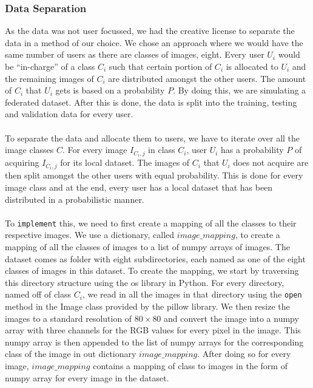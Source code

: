 \documentclass[12pt]{article}
\begin{document}
\subsubsection{Data Separation}
As the data was not user focussed, we had the creative license to separate the data in a method of our choice. We chose an approach where we would have the same number of users as there are classes of images, eight. Every user $U_i$ would be ``in-charge'' of a class $C_i$ such that certain portion of $C_i$ is allocated to $U_i$ and the remaining images of $C_i$ are distributed amongst the other users. The amount of $C_i$ that $U_i$ gets is based on a probability $P$. By doing this, we are simulating a federated dataset. After this is done, the data is split into the training, testing and validation data for every user.
\\\\
To separate the data and allocate them to users, we have to iterate over all the image classes $C$. For every image $I_{C_i, j}$ in class $C_i$, user $U_i$ has a probability $P$ of acquiring $I_{C_i, j}$ for its local dataset. The images of $C_i$ that $U_i$ does not acquire are then split amongst the other users with equal probability. This is done for every image class and at the end, every user has a local dataset that has been distributed in a probabilistic manner. 
\\\\
To \texttt{implement} this, we need to first create a mapping of all the classes to their respective images. We use a dictionary, called $image\_mapping$, to create a mapping of all the classes of images to a list of numpy arrays of images. The dataset comes as folder with eight subdirectories, each named as one of the eight classes of images in this dataset. To create the mapping, we start by traversing this directory structure using the os library in Python. For every directory, named off of class $C_i$, we read in all the images in that directory using the \texttt{open} method in the Image class provided by the pillow library. We then resize the images to a standard resolution of $80 \times 80$ and convert the image into a numpy array with three channels for the RGB values for every pixel in the image. This numpy array is then appended to the list of numpy arrays for the corresponding class of the image in out dictionary $image\_mapping$. After doing so for every image, $image\_mapping$ contains a mapping of class to images in the form of numpy array for every image in the dataset.
\\\\
\end{document}

